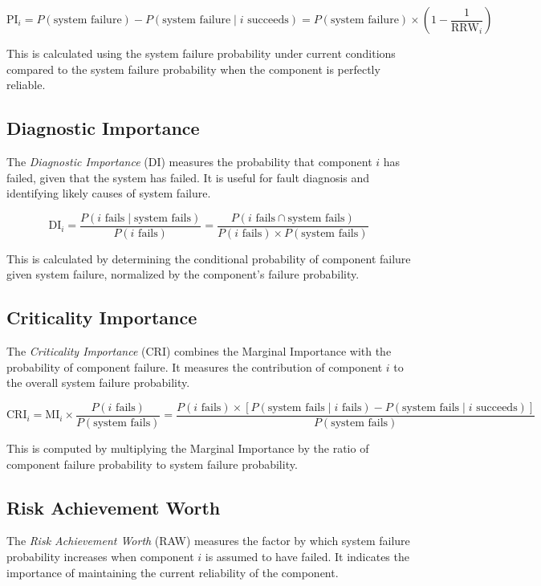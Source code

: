 \[
\text{PI}_i = P(\text{system failure}) - P(\text{system failure} \mid i \text{ succeeds}) = P(\text{system failure}) \times (1 - \frac{1}{\text{RRW}_i})
\]

This is calculated using the system failure probability under current conditions compared to the system failure probability when the component is perfectly reliable.

\subsection{Diagnostic Importance}
The \emph{Diagnostic Importance} (DI) measures the probability that component $i$ has failed, given that the system has failed. It is useful for fault diagnosis and identifying likely causes of system failure.

\[
\text{DI}_i = \frac{P(i \text{ fails} \mid \text{system fails})}{P(i \text{ fails})} = \frac{P(i \text{ fails} \cap \text{system fails})}{P(i \text{ fails}) \times P(\text{system fails})}
\]

This is calculated by determining the conditional probability of component failure given system failure, normalized by the component's failure probability.

\subsection{Criticality Importance}
The \emph{Criticality Importance} (CRI) combines the Marginal Importance with the probability of component failure. It measures the contribution of component $i$ to the overall system failure probability.

\[
\text{CRI}_i = \text{MI}_i \times \frac{P(i \text{ fails})}{P(\text{system fails})} = \frac{P(i \text{ fails}) \times [P(\text{system fails} \mid i \text{ fails}) - P(\text{system fails} \mid i \text{ succeeds})]}{P(\text{system fails})}
\]

This is computed by multiplying the Marginal Importance by the ratio of component failure probability to system failure probability.

\subsection{Risk Achievement Worth}
The \emph{Risk Achievement Worth} (RAW) measures the factor by which system failure probability increases when component $i$ is assumed to have failed. It indicates the importance of maintaining the current reliability of the component.

